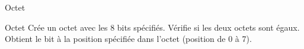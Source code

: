 \begin{tad}




    \begin{tadOperations}{Octet}
            {}%
            {}
            {}%
            {\tadUnParam{\booleen}}
            {}%
            {}
    \end{tadOperations}

    \begin{tadSemantiques}{Octet}
			{Crée un octet avec les 8 bits spécifiés.}%
			{Vérifie si les deux octets sont égaux.}  
			{Obtient le bit à la position spécifiée dans l'octet (position de 0 à 7).}  
    \end{tadSemantiques}

    \begin{tadAxiomes}
    \end{tadAxiomes}

\end{tad}